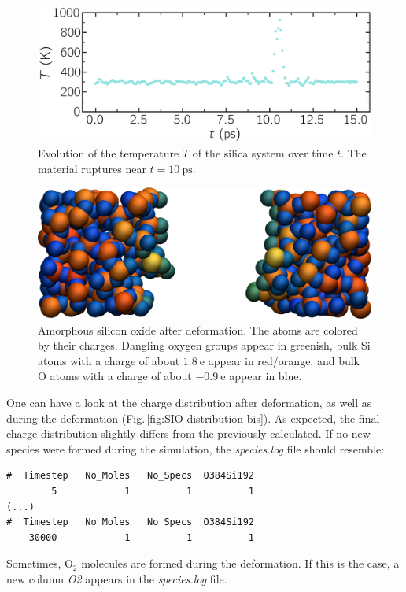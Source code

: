 \documentclass[9pt,tutorial]{livecoms}
\begin{document}
\begin{figure}
\includegraphics[width=\linewidth]{SIO-temperature}
\caption{Evolution of the temperature $T$ of the silica system over time $t$.
The material ruptures near $t = 10~\text{ps}$.}
\label{fig:SIO-temperature}
\end{figure}

\begin{figure}
\includegraphics[width=\linewidth]{SIO-deformed}
\caption{Amorphous silicon oxide after deformation. The atoms are colored by their
charges. Dangling oxygen groups appear in greenish, bulk Si atoms with a charge of
about $1.8~\text{e}$  appear in red/orange, and bulk O atoms with a charge of
about $-0.9 ~ \text{e}$ appear in blue.}
\label{fig:SIO-deformed}
\end{figure}

One can have a look at the charge distribution after deformation, as well as during
the deformation (Fig.\,\ref{fig:SIO-distribution-bis}). As expected, the final
charge distribution slightly differs from the previously calculated. If
no new species were formed during the simulation, the \textit{species.log} file
should resemble:
{\normalsize \begin{verbatim}
#  Timestep   No_Moles   No_Specs  O384Si192
        5            1          1          1
(...)
#  Timestep   No_Moles   No_Specs  O384Si192
    30000            1          1          1
\end{verbatim}}
Sometimes, $\text{O}_2$ molecules are formed during the deformation. If this is
the case, a new column \textit{O2} appears in the \textit{species.log} file.
\end{document}
